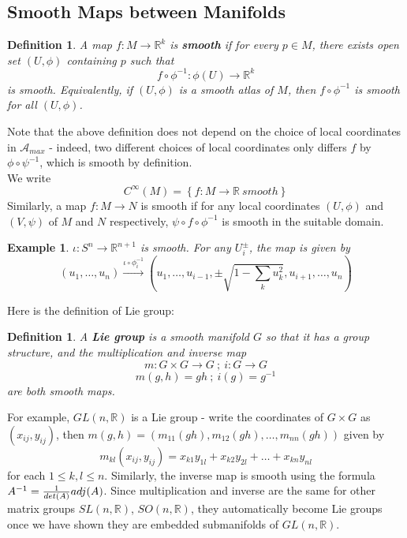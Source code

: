 \documentclass[11pt]{article}
\newtheorem{example}[theorem]{Example}
\newtheorem{definition}[theorem]{Definition}
\newcommand{\bb}[1]{\mathbb{#1}}
\newcommand{\mc}[1]{\mathcal{#1}}
\begin{document}
\subsection{Smooth Maps between Manifolds}
\begin{definition}
A map $f: M \to \bb{R}^k$ is \textbf{smooth} if for every $p \in M$, there exists open set $(U,\phi)$ containing $p$ such that
$$f \circ \phi^{-1} : \phi(U) \to \bb{R}^k$$
is smooth. Equivalently, if $(U,\phi)$ is a smooth atlas of $M$, then $f \circ \phi^{-1}$ is smooth for all $(U, \phi)$.\\
\end{definition}
Note that the above definition does not depend on the choice of local coordinates in $\mc{A}_{max}$ - indeed, two different choices of local coordinates only differs $f$ by $\phi \circ \psi^{-1}$, which is smooth by definition.\\
We write
$$C^{\infty}(M) = \left\{ f: M \to \bb{R}\ smooth\right\}$$
Similarly, a map $f: M \to N$ is smooth if for any local coordinates $(U,\phi)$ and $(V,\psi)$ of $M$ and $N$ respectively,
$\psi \circ f \circ \phi^{-1}$ is smooth in the suitable domain.

\begin{example}
$\iota: S^n \to \bb{R}^{n+1}$ is smooth. For any $U_i^{\pm}$, the map is given by
$$(u_1, \dots, u_n) \stackrel{\iota \circ \phi_i^{-1}}{\longrightarrow} (u_1, \dots, u_{i-1}, \pm\sqrt{1- \sum_k u_k^2}, u_{i+1}, \dots, u_n)$$
\end{example}
Here is the definition of Lie group:
\begin{definition}
A \textbf{Lie group} is a smooth manifold $G$ so that it has a group structure, and the multiplication and inverse map
$$m: G \times G \to G\ ;\ i: G \to G$$
$$m(g,h) = gh\ ;\ i(g) = g^{-1}$$
are both smooth maps.
\end{definition}
For example, $GL(n,\bb{R})$ is a Lie group - write the coordinates of $G \times G$ as $(x_{ij}, y_{ij})$, then $m(g,h) = (m_{11}(gh), m_{12}(gh), \dots, m_{nn}(gh))$ given by
$$m_{kl}(x_{ij}, y_{ij}) = x_{k1}y_{1l} + x_{k2}y_{2l} + \dots + x_{kn}y_{nl}$$
for each $1 \leq k,l \leq n$. Similarly, the inverse map is smooth using the formula $A^{-1} = \frac{1}{\\det(A)}adj(A)$.
Since multiplication and inverse are the same for other matrix groups $SL(n,\bb{R})$, $SO(n,\bb{R})$, they automatically become Lie groups once we have shown they are embedded submanifolds of $GL(n,\bb{R})$.
\end{document}
